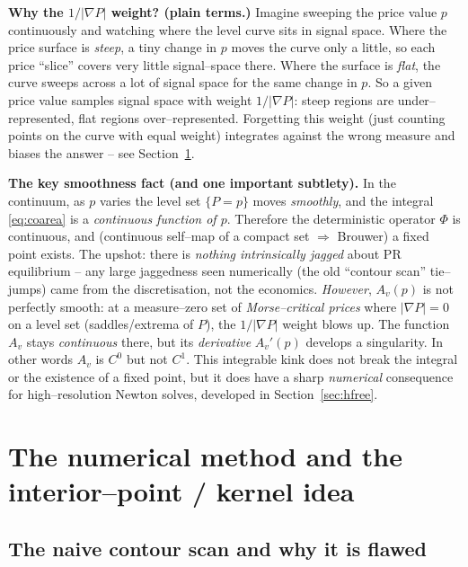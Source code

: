 \documentclass[11pt]{article}
\newcommand{\grad}{\nabla}
\begin{document}
\textbf{Why the $1/|\grad P|$ weight? (plain terms.)} Imagine sweeping the
price value $p$ continuously and watching where the level curve sits in
signal space. Where the price surface is \emph{steep}, a tiny change in $p$
moves the curve only a little, so each price ``slice'' covers very little
signal--space there. Where the surface is \emph{flat}, the curve sweeps
across a lot of signal space for the same change in $p$. So a given price
value samples signal space with weight $1/|\grad P|$: steep regions are
under--represented, flat regions over--represented. Forgetting this weight
(just counting points on the curve with equal weight) integrates against the
wrong measure and biases the answer -- see Section~\ref{sec:numeric}.

\textbf{The key smoothness fact (and one important subtlety).} In the
continuum, as $p$ varies the level set $\{P=p\}$ moves \emph{smoothly}, and
the integral \eqref{eq:coarea} is a \emph{continuous function of $p$}.
Therefore the deterministic operator $\Phi$ is continuous, and (continuous
self--map of a compact set $\Rightarrow$ Brouwer) a fixed point exists. The
upshot: there is \emph{nothing intrinsically jagged} about PR equilibrium --
any large jaggedness seen numerically (the old ``contour scan'' tie--jumps)
came from the discretisation, not the economics. \emph{However}, $A_v(p)$ is
not perfectly smooth: at a measure--zero set of \emph{Morse--critical prices}
where $|\grad P|=0$ on a level set (saddles/extrema of $P$), the
$1/|\grad P|$ weight blows up. The function $A_v$ stays \emph{continuous}
there, but its \emph{derivative} $A_v'(p)$ develops a singularity. In other
words $A_v$ is $C^0$ but not $C^1$. This integrable kink does not break the
integral or the existence of a fixed point, but it does have a sharp
\emph{numerical} consequence for high--resolution Newton solves, developed in
Section~\ref{sec:hfree}.

\section{The numerical method and the interior--point / kernel idea}
\label{sec:numeric}

\subsection{The naive contour scan and why it is flawed}
\end{document}
